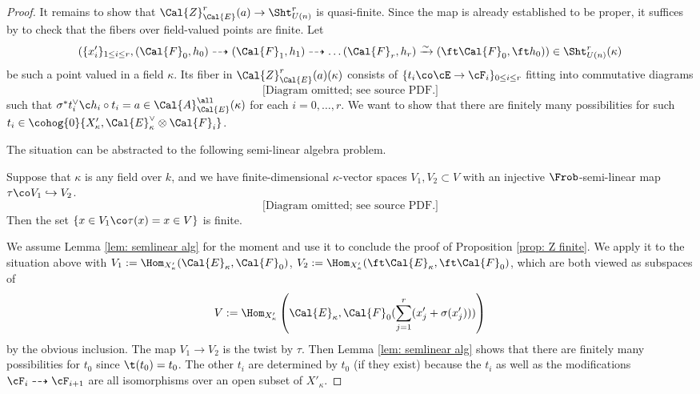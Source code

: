 \begin{proof}
It remains to show that $\Cal{Z}_{\Cal{E}}^{r}(a) \rightarrow \Sht_{U(n)}^{r}$ is quasi-finite. Since the map is already established to be proper, it suffices by \cite[Tag 01TC]{stacks-project} to check that the fibers over field-valued points are finite. Let
\[
(\{x'_{i}\}_{1\le i\le r}, (\Cal{F}_0 ,h_0) \dashrightarrow (\Cal{F}_1, h_1) \dashrightarrow \ldots (\Cal{F}_{r}, h_{r}) \xrightarrow{\sim} (\ft\Cal{F}_0, \ft h_0)) \in \Sht_{U(n)}^{r}(\kappa)
\]
be such a point valued in a field $\kappa$. Its fiber in $\Cal{Z}_{\Cal{E}}^{r}(a)(\kappa)$ consists of $\{t_i \co \cE \rightarrow \cF_i \}_{0\le i\le r}$ fitting into commutative diagrams
\[
\text{[Diagram omitted; see source PDF.]}
\]
such that $\sigma^* t_i^{\vee} \c h_{i}\circ t_i = a \in \Cal{A}_{\Cal{E}}^{\all}(\kappa)$ for each $i = 0, \ldots, r$. We want to show that there are finitely many possibilities for such $t_i \in \cohog{0}{X'_\kappa, \Cal{E}^{\vee}_{\kappa} \otimes \Cal{F}_i}$.

The situation can be abstracted to the following semi-linear algebra problem.

\begin{lemma}
\notready\label{lem: semlinear alg}
Suppose that $\kappa$ is any field over $k$, and we have finite-dimensional $\kappa$-vector spaces $V_1, V_2 \subset V$ with an injective $\Frob$-semi-linear map $\tau \co V_1 \hookrightarrow V_2$.
\[
\text{[Diagram omitted; see source PDF.]}
\]
Then the set $\{ x \in V_1 \co \tau(x) = x  \in V\}$ is finite.
\end{lemma}

We assume Lemma \ref{lem: semlinear alg} for the moment and use it to conclude the proof of Proposition \ref{prop: Z finite}. We apply it to the situation above with $V_1 := \Hom_{X'_{\kappa}} (\Cal{E}_{\kappa}, \Cal{F}_{0})$, $V_2 := \Hom_{X'_{\kappa}}( \ft \Cal{E}_{\kappa},\ft \Cal{F}_0)$, which are both viewed as subspaces of
\[
V := \Hom_{X'_{\kappa}}\left( \Cal{E}_{\kappa},  \Cal{F}_0(\sum_{j=1}^r (x'_j + \sigma(x'_j))) \right)
\]
by the obvious inclusion. The map $V_1 \rightarrow V_2$ is the twist by $\tau$. Then Lemma \ref{lem: semlinear alg} shows that there are finitely many possibilities for $t_0$ since $\t(t_{0})=t_{0}$. The other $t_i$ are determined by $t_0$ (if they exist) because the $t_i$ as well as the modifications $\cF_i \dashrightarrow \cF_{i+1}$ are all isomorphisms over an open subset of $X'_{\kappa}$.
\end{proof}

